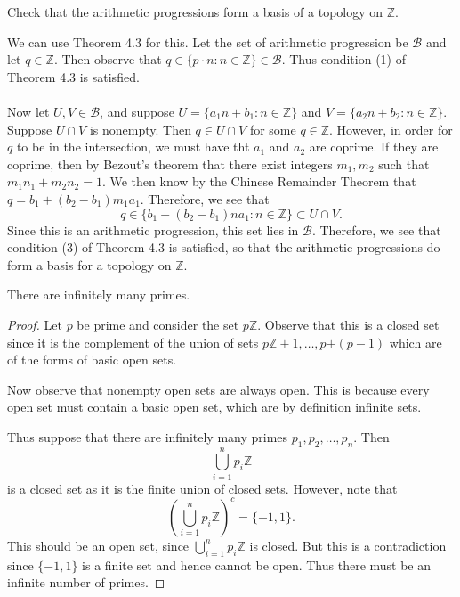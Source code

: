 \documentclass[a4paper,12pt,twoside]{hmcpset}
\begin{document}
\begin{exercise}[Exercise 4.11]
    Check that the arithmetic progressions form a
basis of a topology on $\mathbb{Z}$.
\end{exercise}

\begin{solution}
    We can use Theorem 4.3 for this. Let the set of arithmetic progression
be $\mathscr{B}$ and let $q \in \mathbb{Z}$. Then
observe that $q \in \{p\cdot n : n \in \mathbb{Z}\} \in \mathscr{B}$.
Thus condition (1) of Theorem 4.3 is satisfied.
\\
\\ 
Now let $U, V \in \mathscr{B}$, and suppose $U = \{a_1n + b_1 : n \in
\mathbb{Z}\}$ and $V = \{a_2n + b_2: n \in \mathbb{Z}\}$. Suppose $U
\cap V$ is nonempty. Then $q \in U \cap V$ for some $q \in
\mathbb{Z}$. However, in order for $q$ to be in the intersection, we
must have tht $a_1$ and $a_2$ are coprime. If they are coprime, then
by Bezout's theorem that there exist integers $m_1, m_2$ such that 
$m_1n_1 + m_2n_2 = 1$. We then know by the Chinese
Remainder Theorem that $q = b_1 + (b_2 - b_1)m_1a_1$. Therefore, we
see that 
\[
    q \in \{ b_1 + (b_2 - b_1)na_1: n \in \mathbb{Z}\} \subset U \cap V.
\]
Since this is an arithmetic progression, this set lies in
$\mathscr{B}$. Therefore, we see that condition (3) of Theorem 4.3 is
satisfied, so that the arithmetic progressions do form a basis for a
topology on $\mathbb{Z}$.

\end{solution}

\begin{problem}[Theorem 4.12] 
    There are infinitely many primes. 
\end{problem}

\begin{proof}
    Let $p$ be prime and consider the set $p\mathbb{Z}$. Observe that 
    this is a closed set since it is the
    complement of the union of sets $p\mathbb{Z} + 1, \dots ,
    p\mathbb + (p -1)$ which are of the forms of basic open sets. 

    Now observe that nonempty open sets are always open. This is
    because every open set must contain a basic open set, which are by
    definition infinite sets.
    
    Thus suppose that there are infinitely many primes $p_1, p_2,
    \dots, p_n$. Then 
    \[
        \bigcup_{i = 1}^{n}p_i\mathbb{Z}
    \]
    is a closed set as it is the finite union of closed sets. However,
    note that 
    \[
        \left( \bigcup_{i = 1}^{n}p_i\mathbb{Z} \right)^c = \{-1, 1\}.
    \]
    This should be an open set, since $\bigcup_{i =
    1}^{n}p_i\mathbb{Z}$ is closed. But this is a contradiction since 
    $\{-1, 1\}$ is a finite set and hence cannot be open. Thus there
    must be an infinite number of primes.

\end{proof}
\end{document}

